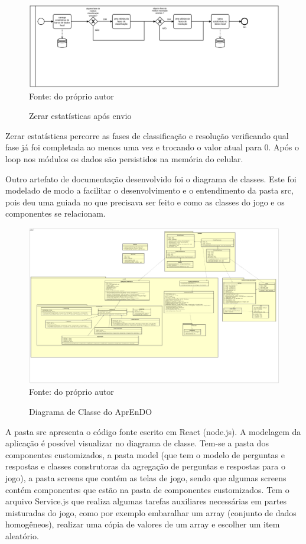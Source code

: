 \begin{figure}[H]
\centering
\caption{Zerar estatísticas após envio}
\includegraphics[width=\textwidth,height=\textheight,keepaspectratio]{figuras/processos/processo_zerar_estatisticas.png}
\label{zerar_estatisticas}
\small{Fonte: do próprio autor}
\end{figure}

Zerar estatísticas percorre as fases de classificação e resolução verificando qual fase já foi completada ao menos uma vez e trocando o valor atual para 0. Após o loop nos módulos os dados são persistidos na memória do celular.

Outro artefato de documentação desenvolvido foi o diagrama de classes. Este foi modelado de modo a facilitar o desenvolvimento e o entendimento da pasta src, pois deu uma guiada no que precisava ser feito e como as classes do jogo e os componentes se relacionam. 

\begin{figure}[H]
\centering
\caption{Diagrama de Classe do AprEnDO}
\includegraphics[width=\textwidth,height=\textheight,keepaspectratio]{figuras/DC_novo2.png}
\small{Fonte: do próprio autor}
\end{figure}

A pasta src apresenta o código fonte escrito em React (node.js).
A modelagem da aplicação é possível visualizar no diagrama de classe. Tem-se a pasta dos componentes customizados, a pasta model (que tem o modelo de perguntas e respostas e classes construtoras da agregação de perguntas e respostas para o jogo),  a pasta screens que contém as telas de jogo, sendo que algumas screens contém componentes que estão na pasta de componentes customizados. Tem o arquivo Service.js que realiza algumas tarefas auxiliares necessárias em partes misturadas do jogo, como por exemplo embaralhar um array (conjunto de dados homogêneos), realizar uma cópia de valores de um array e escolher um item aleatório.

